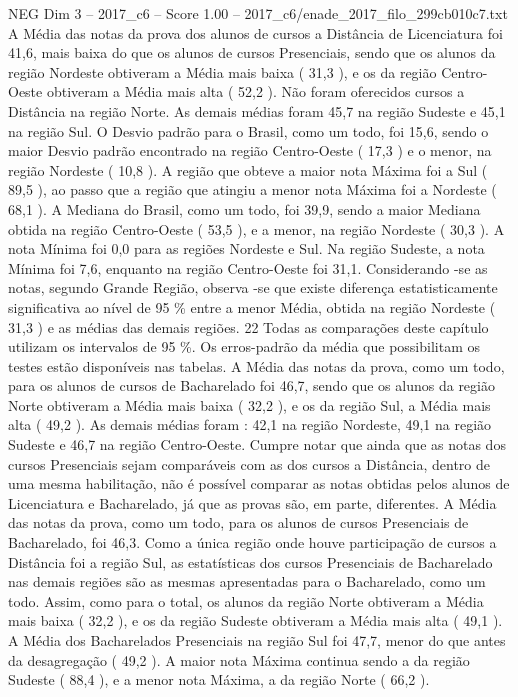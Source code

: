 \begin{textsample}{NEG Dim 3 – 2017\_c6 – Score 1.00 – 2017\_c6/enade\_2017\_filo\_299cb010c7.txt}
A Média das notas da prova dos alunos de cursos a Distância de Licenciatura foi 41,6, mais baixa do que os alunos de cursos Presenciais, sendo que os alunos da região Nordeste obtiveram a Média mais baixa ( 31,3 ), e os da região Centro-Oeste obtiveram a Média mais alta ( 52,2 ).
Não foram oferecidos cursos a Distância na região Norte.
As demais médias foram 45,7 na região Sudeste e 45,1 na região Sul.
O Desvio padrão para o Brasil, como um todo, foi 15,6, sendo o maior Desvio padrão encontrado na região Centro-Oeste ( 17,3 ) e o menor, na região Nordeste ( 10,8 ).
A região que obteve a maior nota Máxima foi a Sul ( 89,5 ), ao passo que a região que atingiu a menor nota Máxima foi a Nordeste ( 68,1 ).
A Mediana do Brasil, como um todo, foi 39,9, sendo a maior Mediana obtida na região Centro-Oeste ( 53,5 ), e a menor, na região Nordeste ( 30,3 ).
A nota Mínima foi 0,0 para as regiões Nordeste e Sul.
Na região Sudeste, a nota Mínima foi 7,6, enquanto na região Centro-Oeste foi 31,1.
Considerando -se as notas, segundo Grande Região, observa -se que existe diferença estatisticamente significativa ao nível de 95 \% entre a menor Média, obtida na região Nordeste ( 31,3 ) e as médias das demais regiões. 22 Todas as comparações deste capítulo utilizam os intervalos de 95 \%.
Os erros-padrão da média que possibilitam os testes estão disponíveis nas tabelas.
A Média das notas da prova, como um todo, para os alunos de cursos de Bacharelado foi 46,7, sendo que os alunos da região Norte obtiveram a Média mais baixa ( 32,2 ), e os da região Sul, a Média mais alta ( 49,2 ).
As demais médias foram : 42,1 na região Nordeste, 49,1 na região Sudeste e 46,7 na região Centro-Oeste.
Cumpre notar que ainda que as notas dos cursos Presenciais sejam comparáveis com as dos cursos a Distância, dentro de uma mesma habilitação, não é possível comparar as notas obtidas pelos alunos de Licenciatura e Bacharelado, já que as provas são, em parte, diferentes.
A Média das notas da prova, como um todo, para os alunos de cursos Presenciais de Bacharelado, foi 46,3.
Como a única região onde houve participação de cursos a Distância foi a região Sul, as estatísticas dos cursos Presenciais de Bacharelado nas demais regiões são as mesmas apresentadas para o Bacharelado, como um todo.
Assim, como para o total, os alunos da região Norte obtiveram a Média mais baixa ( 32,2 ), e os da região Sudeste obtiveram a Média mais alta ( 49,1 ).
A Média dos Bacharelados Presenciais na região Sul foi 47,7, menor do que antes da desagregação ( 49,2 ).
A maior nota Máxima continua sendo a da região Sudeste ( 88,4 ), e a menor nota Máxima, a da região Norte ( 66,2 ).

\end{textsample}

